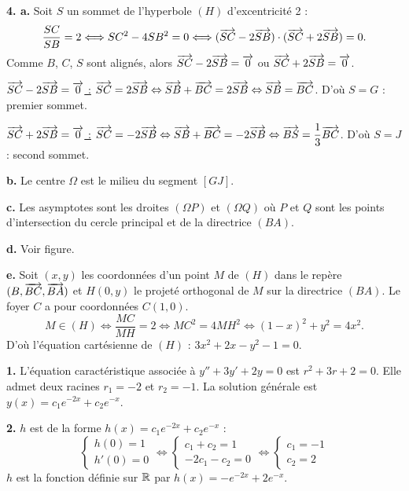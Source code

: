 \documentclass[11pt]{article}
\begin{document}
\textbf{4. a.} Soit $S$ un sommet de l'hyperbole $(H)$ d'excentricité 2 :
\[ \frac{SC}{SB} = 2 \Longleftrightarrow SC^2 - 4SB^2 = 0 \Longleftrightarrow (\overrightarrow{SC} - 2\overrightarrow{SB}) \cdot (\overrightarrow{SC} + 2\overrightarrow{SB}) = 0. \]
Comme $B$, $C$, $S$ sont alignés, alors $\overrightarrow{SC} - 2\overrightarrow{SB} = \overrightarrow{0}$ ou $\overrightarrow{SC} + 2\overrightarrow{SB} = \overrightarrow{0}$.

\underline{$\overrightarrow{SC} - 2\overrightarrow{SB} = \overrightarrow{0}$ :} $\overrightarrow{SC} = 2\overrightarrow{SB} \Leftrightarrow \overrightarrow{SB} + \overrightarrow{BC} = 2\overrightarrow{SB} \Leftrightarrow \overrightarrow{SB} = \overrightarrow{BC}$. D'où $S = G$ : premier sommet.

\underline{$\overrightarrow{SC} + 2\overrightarrow{SB} = \overrightarrow{0}$ :} $\overrightarrow{SC} = -2\overrightarrow{SB} \Leftrightarrow \overrightarrow{SB} + \overrightarrow{BC} = -2\overrightarrow{SB} \Leftrightarrow \overrightarrow{BS} = \dfrac{1}{3}\overrightarrow{BC}$. D'où $S = J$ : second sommet.

\textbf{b.} Le centre $\Omega$ est le milieu du segment $[GJ]$.

\textbf{c.} Les asymptotes sont les droites $(\Omega P)$ et $(\Omega Q)$ où $P$ et $Q$ sont les points d'intersection du cercle principal et de la directrice $(BA)$.

\textbf{d.} Voir figure.

\textbf{e.} Soit $(x, y)$ les coordonnées d'un point $M$ de $(H)$ dans le repère $(B,\overrightarrow{BC},\overrightarrow{BA})$ et $H(0, y)$ le projeté orthogonal de $M$ sur la directrice $(BA)$. Le foyer $C$ a pour coordonnées $C(1, 0)$.
\[ M \in (H) \Longleftrightarrow \frac{MC}{MH} = 2 \Longleftrightarrow MC^2 = 4MH^2 \Longleftrightarrow (1 - x)^2 + y^2 = 4x^2. \]
D'où l'équation cartésienne de $(H)$ : $3x^2 + 2x - y^2 - 1 = 0$.


\textbf{1.} L'équation caractéristique associée à $y'' + 3y' + 2y = 0$ est $r^2 + 3r + 2 = 0$. Elle admet deux racines $r_1 = -2$ et $r_2 = -1$. La solution générale est $y(x) = c_1 e^{-2x} + c_2 e^{-x}$.

\textbf{2.} $h$ est de la forme $h(x) = c_1 e^{-2x} + c_2 e^{-x}$ :
\[ \begin{cases} h(0) = 1 \\ h'(0) = 0 \end{cases} \Longleftrightarrow \begin{cases} c_1 + c_2 = 1 \\ -2c_1 - c_2 = 0 \end{cases} \Longleftrightarrow \begin{cases} c_1 = -1 \\ c_2 = 2 \end{cases} \]
$h$ est la fonction définie sur $\mathbb{R}$ par $h(x) = -e^{-2x} + 2e^{-x}$.
\end{document}
